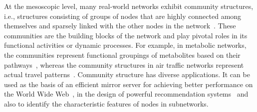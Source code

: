 \documentclass[pre,floatfix,twocolumn,showpacs,a4paper,nofootinbib]{revtex4}
\begin{document}
At the mesoscopic level, many real-world networks exhibit community structures,
i.e., structures consisting of groups of nodes that are highly connected 
among themselves and sparsely linked with the other nodes in the network~\cite{girvan2002community,krause2003compartments}.  
These communities are the building blocks of the network and play pivotal roles in its functional activities or dynamic 
processes. For example, in metabolic networks, the communities represent functional groupings of metabolites based on their pathways~\cite{guimera2005functional},
whereas the community structures in air traffic networks represent actual travel patterns~\cite{rosvall2014memory}.
Community structure has diverse applications. It can be used as the basis of an efficient mirror server for achieving
better performance on the World Wide Web~\cite{krishnamurthy2000network}, in the design of powerful recommendation systems~\cite{reddy2002graph} and also to identify
the characteristic features of nodes in subnetworks.  
\end{document}
